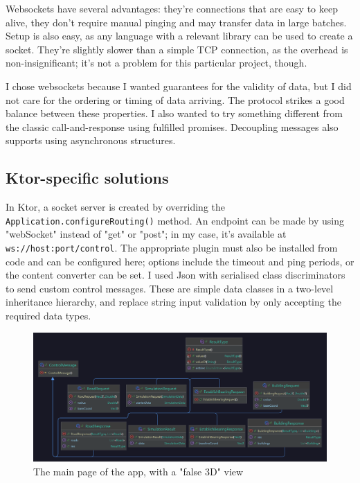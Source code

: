 Websockets have several advantages: they're connections that are easy to keep alive, they don't require manual pinging and may transfer data in large batches. Setup is also easy, as any language with a relevant library can be used to create a socket. They're slightly slower than a simple TCP connection, as the overhead is non-insignificant; it's not a problem for this particular project, though.

I chose websockets because I wanted guarantees for the validity of data, but I did not care for the ordering or timing of data arriving. The protocol strikes a good balance between these properties. I also wanted to try something different from the classic call-and-response using fulfilled promises. Decoupling messages also supports using asynchronous structures.

\subsection{Ktor-specific solutions}

In Ktor, a socket server is created by overriding the \verb|Application.configureRouting()| method. An endpoint can be made by using "webSocket" instead of "get" or "post"; in my case, it's available at \verb|ws://host:port/control|. The appropriate plugin must also be installed from code and can be configured here; options include the timeout and ping periods, or the content converter can be set. I used Json with serialised class discriminators to send custom control messages. These are simple data classes in a two-level inheritance hierarchy, and replace string input validation by only accepting the required data types.

\begin{figure}[!ht]
    \centering
    \includegraphics[width=150mm, keepaspectratio]{images/control-messages.png}
    \caption{The main page of the app, with a "false 3D" view}
\end{figure}

